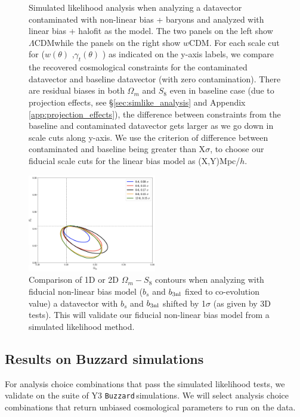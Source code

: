 \documentclass[fleqn,usenatbib]{mnras}
\newcommand{\gammat}{\ensuremath{\gamma_{t}(\theta)} }
\newcommand{\wtheta}{\ensuremath{w(\theta)} }
\newcommand{\lcdm}{$\Lambda$CDM}
\newcommand{\wcdm}{$w$CDM}
\newcommand{\buzzard}{\texttt{Buzzard}\,}
\begin{document}
\begin{figure}
\caption[]{Simulated likelihood analysis when analyzing a datavector contaminated with non-linear bias + baryons and analyzed with linear bias + halofit as the model. The two panels on the left show \lcdm while the panels on the right show \wcdm. For each scale cut for (\wtheta,\gammat) as indicated on the y-axis labels, we compare the recovered cosmological  constraints for the contaminated datavector and baseline datavector (with zero contamination). There are residual biases in both $\Omega_m$ and $S_8$ even in baseline case (due to projection effects, see \S\ref{sec:simlike_analysis} and Appendix \ref{app:projection_effects}), the difference between constraints from the baseline and contaminated datavector gets larger as we go down in scale cuts along y-axis. We use the criterion of difference between contaminated and baseline being greater than X$\sigma$, to choose our fiducial scale cuts for the linear bias model as (X,Y)Mpc/$h$.    }
\label{fig:sim_lin}
\end{figure}


\begin{figure}
\includegraphics[width=0.5\textwidth,draft]{figs/temp.png}
\caption[]{Comparison of 1D or 2D $\Omega_m-S_8$ contours when analyzing with fiducial non-linear bias model ($b_s$ and $b_{\rm 3nl}$ fixed to co-evolution value) a datavector with $b_s$ and $b_{\rm 3nl}$ shifted by 1$\sigma$ (as given by 3D tests). This will validate our fiducial non-linear bias model from a simulated likelihood method. }
\label{fig:nlbias_comp}
\end{figure}

\subsection{Results on Buzzard simulations}

For  analysis choice combinations that pass the simulated likelihood tests, we validate on the suite of Y3 \buzzard simulations. We will select analysis choice combinations that return unbiased cosmological parameters to run on the data. 
\end{document}
